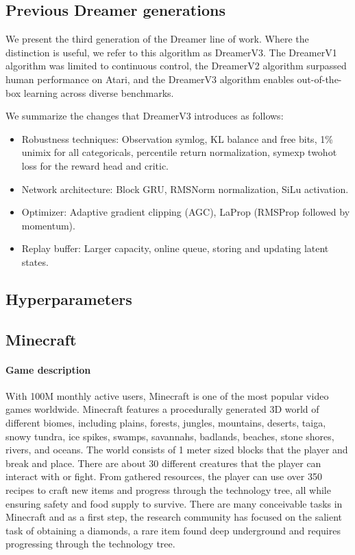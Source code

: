 

\subsection*{Previous Dreamer generations}

We present the third generation of the Dreamer line of work. Where the distinction is useful, we refer to this algorithm as DreamerV3. The DreamerV1 algorithm\citep{hafner2019dreamer} was limited to continuous control, the DreamerV2 algorithm\citep{hafner2020dreamerv2} surpassed human performance on Atari, and the DreamerV3 algorithm enables out-of-the-box learning across diverse benchmarks.

We summarize the changes that DreamerV3 introduces as follows:
\begin{itemize}
\item Robustness techniques: Observation symlog, KL balance and free bits, 1\% unimix for all categoricals, percentile return normalization, symexp twohot loss for the reward head and critic.
\item Network architecture: Block GRU, RMSNorm normalization, SiLu activation.
\item Optimizer: Adaptive gradient clipping (AGC), LaProp (RMSProp followed by momentum).
\item Replay buffer: Larger capacity, online queue, storing and updating latent states.
\end{itemize}


\clearpage
\subsection*{Hyperparameters}


\clearpage
\subsection*{Minecraft}
\label{sec:mcenv}

\paragraph{Game description}
With 100M monthly active users, Minecraft is one of the most popular video games worldwide.
Minecraft features a procedurally generated 3D world of different biomes, including plains, forests, jungles, mountains, deserts, taiga, snowy tundra, ice spikes, swamps, savannahs, badlands, beaches, stone shores, rivers, and oceans.
The world consists of 1 meter sized blocks that the player and break and place.
There are about 30 different creatures that the player can interact with or fight.
From gathered resources, the player can use over 350 recipes to craft new items and progress through the technology tree, all while ensuring safety and food supply to survive.
There are many conceivable tasks in Minecraft and as a first step, the research community has focused on the salient task of obtaining a diamonds, a rare item found deep underground and requires progressing through the technology tree.

